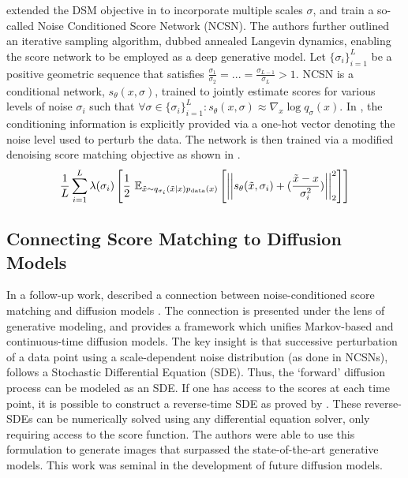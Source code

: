 \cite{Song2019} extended the DSM objective in  to incorporate multiple scales $\sigma$, and train a so-called Noise Conditioned Score Network (NCSN). The authors further outlined an iterative sampling algorithm, dubbed annealed Langevin dynamics, enabling the score network to be employed as a deep generative model. Let $\{\sigma_i\}_{i=1}^L$ be a positive geometric sequence that satisfies $\frac{\sigma_1}{\sigma_2} = ... = \frac{\sigma_{L-1}}{\sigma_{L}} >  1$. NCSN is a conditional network, $s_{\theta}(x,\sigma)$, trained to jointly estimate scores for various levels of noise $\sigma_i$ such that $\forall \sigma \in \{\sigma_i\}_{i=1}^L: s_{\theta}(x,\sigma) \approx \nabla_x \log q_{\sigma}(x)$. In \cite{Song2019}, the conditioning information is explicitly provided via a one-hot vector denoting the noise level used to perturb the data. The network is then trained via a modified denoising score matching objective as shown in .
\begin{equation}
\label{eq:ncsn_dsm}
\frac{1}{L} \sum_{i=1}^L \lambda(\sigma_i)
\left[ {\frac{1}{2} \displaystyle \text{~} \mathbb{E}_{\tilde{x}\sim q_{\sigma_i} (\tilde{x}|x) p_{\text{data}}(x)} \left[ { \left|\left| { s_{\theta}(\tilde{x}, \sigma_i) + (\frac{\tilde{x} - x}{\sigma_i^2}) } \right|\right|^2_2  } \right] } \right]
\end{equation}


\subsection*{Connecting Score Matching to Diffusion Models}

In a follow-up work, \cite{song2020score} described a connection between noise-conditioned score matching and diffusion models \cite{sohl2015deep}. The connection is presented under the lens of generative modeling, and provides a framework which unifies Markov-based and continuous-time diffusion models. The key insight is that successive perturbation of a data point using a scale-dependent noise distribution (as done in NCSNs), follows a Stochastic Differential Equation (SDE). Thus, the `forward' diffusion process can be modeled as an SDE. If one has access to the scores at each time point, it is possible to construct a reverse-time SDE as proved by \cite{anderson1982reverse}. These reverse-SDEs can be numerically solved using any differential equation solver, only requiring access to the score function. The authors were able to use this formulation to generate images that surpassed the state-of-the-art generative models. This work was seminal in the development of future diffusion models.


